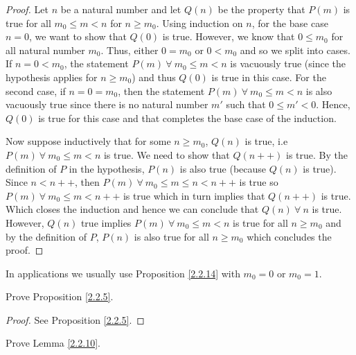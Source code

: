 \begin{proof}
Let \(n\) be a natural number and let \(Q(n)\) be the property that \(P(m)\) is true for all \(m_0 \leq m < n\) for \(n \geq m_0\).
Using induction on \(n\), for the base case \(n = 0\), we want to show that \(Q(0)\) is true.
However, we know that \(0 \leq m_0\) for all natural number \(m_0\).
Thus, either \(0 = m_0\) or \(0 < m_0\) and so we split into cases.
If \(n = 0 < m_0\), the statement \(P(m) \ \forall\ m_0 \leq m < n\) is vacuously true (since the hypothesis applies for \(n \geq m_0\)) and thus \(Q(0)\) is true in this case.
For the second case, if \(n = 0 = m_0\), then the statement \(P(m) \ \forall\ m_0 \leq m < n\) is also vacuously true since there is no natural number \(m'\) such that \(0 \leq m' < 0\). Hence, \(Q(0)\) is true for this case and that completes the base case of the induction.

Now suppose inductively that for some \(n \geq m_0\), \(Q(n)\) is true, i.e \(P(m) \ \forall\ m_0 \leq m < n\) is true.
We need to show that \(Q(n++)\) is true.
By the definition of \(P\) in the hypothesis, \(P(n)\) is also true (because \(Q(n)\) is true).
Since \(n < n++\), then \(P(m) \ \forall\ m_0 \leq m \leq n < n++\) is true so \(P(m) \ \forall\ m_0 \leq m < n++\) is true which in turn implies that \(Q(n++)\) is true.
Which closes the induction and hence we can conclude that \(Q(n) \ \forall\ n\) is true.
However, \(Q(n)\) true implies \(P(m) \ \forall\ m_0 \leq m < n\) is true for all \(n \geq m_0\) and by the definition of \(P\), \(P(n)\) is also true for all \(n \geq m_0\) which concludes the proof.
\end{proof}

\begin{remark}\label{2.2.15}
In applications we usually use Proposition \ref{2.2.14} with \(m_0 = 0\) or \(m_0 = 1\).
\end{remark}

\exercisesection

\begin{exercise}\label{ex 2.2.1}
Prove Proposition \ref{2.2.5}.
\end{exercise}

\begin{proof}
See Proposition \ref{2.2.5}.
\end{proof}

\begin{exercise}\label{ex 2.2.2}
Prove Lemma \ref{2.2.10}.
\end{exercise}

